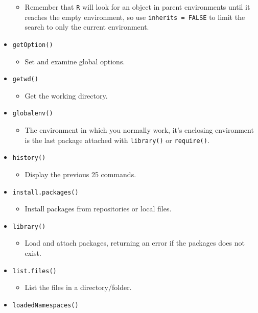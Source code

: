 \documentclass[
]{book}
\providecommand{\tightlist}{%
  \setlength{\itemsep}{0pt}\setlength{\parskip}{0pt}}
\begin{document}
\begin{itemize}
  \begin{itemize}
  \tightlist
  \item
    Remember that \texttt{R} will look for an object in parent environments until it reaches the empty environment, so use \texttt{inherits\ =\ FALSE} to limit the search to only the current environment.
  \end{itemize}
\item
  \texttt{getOption()}

  \begin{itemize}
  \tightlist
  \item
    Set and examine global options.
  \end{itemize}
\item
  \texttt{getwd()}

  \begin{itemize}
  \tightlist
  \item
    Get the working directory.
  \end{itemize}
\item
  \texttt{globalenv()}

  \begin{itemize}
  \tightlist
  \item
    The environment in which you normally work, it's enclosing environment is the last package attached with \texttt{library()} or \texttt{require()}.
  \end{itemize}
\item
  \texttt{history()}

  \begin{itemize}
  \tightlist
  \item
    Display the previous 25 commands.
  \end{itemize}
\item
  \texttt{install.packages()}

  \begin{itemize}
  \tightlist
  \item
    Install packages from repositories or local files.
  \end{itemize}
\item
  \texttt{library()}

  \begin{itemize}
  \tightlist
  \item
    Load and attach packages, returning an error if the packages does not exist.
  \end{itemize}
\item
  \texttt{list.files()}

  \begin{itemize}
  \tightlist
  \item
    List the files in a directory/folder.
  \end{itemize}
\item
  \texttt{loadedNamespaces()}


\end{itemize}
\end{document}
